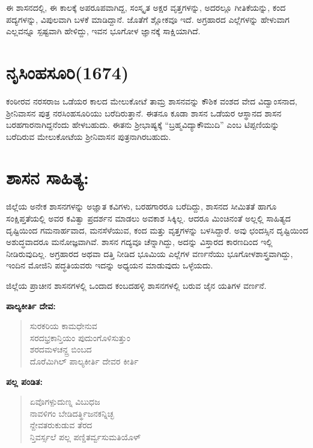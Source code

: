 ಈ ಶಾಸನದಲ್ಲಿ, ಈ ಕಾಲಕ್ಕೆ ಅಪರೂಪವಾಗಿದ್ದ, ಸಂಸ್ಕೃತ ಅಕ್ಷರ ವೃತ್ತಗಳನ್ನು, ಅದರಲ್ಲೂ ಗೀತಿಕೆಯನ್ನು, ಕಂದ ಪದ್ಯಗಳನ್ನು, ವಿಪುಲವಾಗಿ ಬಳಕೆ ಮಾಡಿದ್ದಾನೆ. ಜೊತೆಗೆ ಶ್ಲೋಕವೂ ಇದೆ. ಅಗ್ರಹಾರದ ಎಲ್ಲೆಗಳನ್ನು ಹೇಳುವಾಗ ಎಲ್ಲವನ್ನೂ ಸ್ಪಷ್ಟವಾಗಿ ಹೇಳಿದ್ದು, ಇವನ ಭೂಗೋಳ ಜ್ಞಾನಕ್ಕೆ ಸಾಕ್ಷಿಯಾಗಿದೆ.


\section{ನೃಸಿಂಹಸೂರಿ(1674)}

ಕಂಠೀರವ ನರಸರಾಜ ಒಡೆಯರ ಕಾಲದ ಮೇಲುಕೋಟೆ ತಾಮ್ರ ಶಾಸನವನ್ನು ಕೌಶಿಕ ವಂಶದ ವೇದ ವಿದ್ವಾಂಸನಾದ, ಶ‍್ರೀನಿವಾಸನ ಪುತ್ರ ನರಸಿಂಹಸೂರಿಯು ಬರೆದಿರುತ್ತಾನೆ. ಈತನೂ ಕೂಡಾ ಶಾಸನ ಒಡೆಯರ ಆಸ್ಥಾನದ ಶಾಸನ ಬರಹಗಾರನಾಗಿದ್ದನೆಂದು ಹೇಳಬಹುದು. ಈತನು ಶ‍್ರೀಭಾಷ್ಯಕ್ಕೆ “ಬ್ರಹ್ಮವಿದ್ಯಾಕೌಮುದಿ” ಎಂಬ ಟಿಪ್ಪಣಿಯನ್ನು ಬರೆದಿರುವ ಮೇಲುಕೋಟೆಯ ಶ‍್ರೀನಿವಾಸನ ಪುತ್ರನಾಗಿರಬಹುದು.


\section{ಶಾಸನ ಸಾಹಿತ್ಯ:}

ಜಿಲ್ಲೆಯ ಅನೇಕ ಶಾಸನಗಳನ್ನು ಅಜ್ಞಾತ ಕವಿಗಳು, ಬರಹಗಾರರೂ ಬರೆದಿದ್ದು, ಶಾಸನದ ಸೀಮಿತತೆ ಹಾಗೂ ಸಂಕ್ಷಿಪ್ತತೆಯಲ್ಲಿ ಅವರ ಕವಿತ್ವಾ ಪ್ರದರ್ಶನ ಮಾಡಲು ಅವಕಾಶ ಸಿಕ್ಕಿಲ್ಲ. ಆದರೂ ಮಿಂಚಿನಂತೆ ಅಲ್ಲಲ್ಲಿ ಸಾಹಿತ್ಯದ ದೃಷ್ಟಿಯಿಂದ ಗಮನಾರ್ಹವಾದ, ಮನಸೆಳೆಯುವ, ಕಂದ ಮತ್ತು ವೃತ್ತಗಳನ್ನು ಬಳಸಿದ್ದಾರೆ. ಅವು ಛಂದಸ್ಸಿನ ದೃಷ್ಟಿಯಿಂದ ಅಶುದ್ಧವಾದರೂ ಮನೋಜ್ಞವಾಗಿವೆ. ಶಾಸನ ಗದ್ಯವೂ ಚೆನ್ನಾಗಿದ್ದು, ಅದನ್ನು ವಿಸ್ತಾರದ ಕಾರಣದಿಂದ ಇಲ್ಲಿ ನೀಡಿರುವುದಿಲ್ಲ. ಅಗ್ರಹಾರದ ಅಥವಾ ದತ್ತಿ ನೀಡಿದ ಭೂಮಿಯ ಎಲ್ಲೆಗಳ ವರ್ಣನೆಯು ಭೂಗೋಳಶಾಸ್ತ್ರವಾಗಿದ್ದು, ಇಂದಿನ ಮೋಜಿನಿ ಪದ್ಧತಿಯವರು ಇದನ್ನು ಅಧ್ಯಯನ ಮಾಡುವುದು ಒಳ್ಳೆಯದು.

ಜಿಲ್ಲೆಯ ಪ್ರಾಚೀನ ಶಾಸನಗಳಲ್ಲಿ ಒಂದಾದ ಕಂಬದಹಳ್ಳಿ ಶಾಸನಗಳಲ್ಲಿ ಬರುವ ಜೈನ ಯತಿಗಳ ವರ್ಣನೆ.

\textbf{ಪಾಲ್ಯಕೀರ್ತಿ ದೇವ:}

\begin{verse}
ಸುರಕರಿಯ ಕಾಮಧೇನುವ \\ ಸರದಭ್ರಕಾನ್ತಿಯಂ ಪುದುಂಗೊಳಿಸುತ್ತುಂ \\ ಶರದಮಳಚನ್ದ್ರ ಬಿಂಬದ \\ ದೊರೆಮಿಗಿಲ್​ ಪಾಲ್ಯಕೀರ್ತಿ ದೇವರ ಕೀರ್ತಿ
\end{verse}

\textbf{ಪಲ್ಲ ಪಂಡಿತ:}

\begin{verse}
 ಏವೊಗಳ್ಪುದುಣ್ನ ವಿಬುಧಜ \\ ನಾವಳಿಗಂ ಬೇಡಿದರ್ತ್ಥಿಜನಕನ್ನಿಚ್ಛ \\ ನ್ದೇವತರುಕುಡುವ ತೆರದ \\ ನ್ತಿವರ್ಸ್ಸಲೆ ಪಲ್ಲ ಪಣ್ಡಿತರ್ವ್ವಸುಮತಿಯೊಳ್​
\end{verse}

